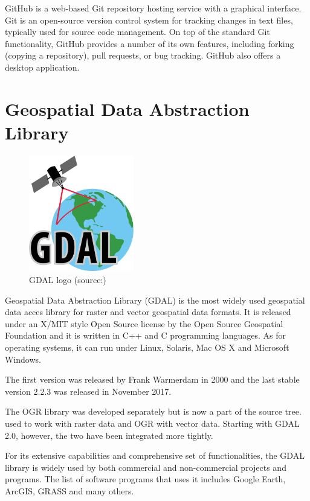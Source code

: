   GitHub is a web-based Git repository hosting service with a
  graphical interface. Git is an open-source version control system
  for tracking changes in text files, typically used for source code
  management.\cite{git} On top of the standard Git functionality,
  GitHub provides a number of its own features, including forking
  (copying a repository), pull requests, or bug tracking. GitHub also
  offers a desktop application.

\section{Geospatial Data Abstraction Library}

\begin{figure}[H] \centering
      \includegraphics[width=130pt]{./pictures/gdal.png}
      \caption[GDAL logo]{GDAL logo (source:{\cite{gdal}})}
      \label{fig:GDAL}
  \end{figure}

  Geospatial Data Abstraction Library (GDAL) is the most widely
  used geospatial data acces library for raster and vector geospatial
  data formats. It is released under an X/MIT style Open Source
  license by the Open Source Geospatial Foundation and it is written
  in C++ and C programming languages. As for operating systems, it can
  run under Linux, Solaris, Mac OS X and Microsoft Windows.\cite{gdal}

  The first version was released by Frank Warmerdam in 2000 and the
  last stable version 2.2.3 was released in November
  2017.\cite{gdalrelease}


  The OGR library was developed separately but is now a part of
  the  source tree.  used to work with raster data
  and OGR with vector data. Starting with GDAL 2.0, however, the two
  have been integrated more tightly.

  For its extensive capabilities and comprehensive set of
  functionalities, the GDAL library is widely used by both
  commercial and non-commercial  projects and programs. The
  list of software programs that uses it includes Google Earth,
  ArcGIS, GRASS  and many others.\cite{gdalogr}

